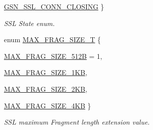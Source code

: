 \begin{DoxyCompactItemize}
\par
\hyperlink{a00590_ae32da31c01290e41ef6e3d59ee2caf2aa60688a63a988fb9e11fe92ab1f510898}{GSN\_\-SSL\_\-CONN\_\-CLOSING}
 \}
\begin{DoxyCompactList}\small\item\em SSL State enum. \end{DoxyCompactList}\item 
enum \hyperlink{a00590_a509253ad5fddd526327d77c721bc27df}{MAX\_\-FRAG\_\-SIZE\_\-T} \{ \par
\hyperlink{a00590_a509253ad5fddd526327d77c721bc27dfa8c6ca370cf3fbf21efd93e3309f00cc8}{MAX\_\-FRAG\_\-SIZE\_\-512B} =  1, 
\par
\hyperlink{a00590_a509253ad5fddd526327d77c721bc27dfa1c5f06e10b9cc38fcc576c0ffee66245}{MAX\_\-FRAG\_\-SIZE\_\-1KB}, 
\par
\hyperlink{a00590_a509253ad5fddd526327d77c721bc27dfa02b8591f3b00419dad0f4477e4ab7074}{MAX\_\-FRAG\_\-SIZE\_\-2KB}, 
\par
\hyperlink{a00590_a509253ad5fddd526327d77c721bc27dfad3b9a220ae7be1ff2e558c7ff7a65771}{MAX\_\-FRAG\_\-SIZE\_\-4KB}
 \}
\begin{DoxyCompactList}\small\item\em SSL maximum Fragment length extension value. \end{DoxyCompactList}\end{DoxyCompactItemize}
